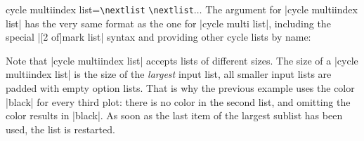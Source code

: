 \begin{pgfplotskey}{%
    cycle multiindex list=\texttt{\textbackslash nextlist}%
    \texttt{\textbackslash nextlist}$\ldots$
}
    The argument for |cycle multiindex list| has the very same format as the
    one for |cycle multi list|, including the special |[2 of]mark list| syntax
    and providing other cycle lists by name:
\begin{codeexample}[]
\end{codeexample}

    Note that |cycle multiindex list| accepts lists of different sizes. The
    size of a |cycle multiindex list| is the size of the \emph{largest} input
    list, all smaller input lists are padded with empty option lists. That is
    why the previous example uses the color |black| for every third plot: there
    is no color in the second list, and omitting the color results in |black|.
    As soon as the last item of the largest sublist has been used, the list is
    restarted.
\end{pgfplotskey}

